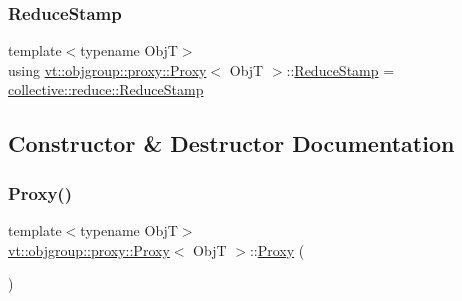\mbox{\label{structvt_1_1objgroup_1_1proxy_1_1_proxy_a337be4c20cf11ff6477c7a66208cc909}} 
\subsubsection{\texorpdfstring{Reduce\+Stamp}{ReduceStamp}}
{\footnotesize\ttfamily template$<$typename ObjT$>$ \\
using \hyperlink{structvt_1_1objgroup_1_1proxy_1_1_proxy}{vt\+::objgroup\+::proxy\+::\+Proxy}$<$ ObjT $>$\+::\hyperlink{structvt_1_1objgroup_1_1proxy_1_1_proxy_a337be4c20cf11ff6477c7a66208cc909}{Reduce\+Stamp} =  \hyperlink{namespacevt_1_1collective_1_1reduce_a7b7cb3021ac5654d92825d9fab0250b2}{collective\+::reduce\+::\+Reduce\+Stamp}}



\subsection{Constructor \& Destructor Documentation}
\mbox{\label{structvt_1_1objgroup_1_1proxy_1_1_proxy_a5450776d9cabb2556765c0d0227c9589}} 
\subsubsection{\texorpdfstring{Proxy()}{Proxy()}\hspace{0.1cm}{\footnotesize\ttfamily [1/4]}}
{\footnotesize\ttfamily template$<$typename ObjT$>$ \\
\hyperlink{structvt_1_1objgroup_1_1proxy_1_1_proxy}{vt\+::objgroup\+::proxy\+::\+Proxy}$<$ ObjT $>$\+::\hyperlink{structvt_1_1objgroup_1_1proxy_1_1_proxy}{Proxy} (\begin{DoxyParamCaption}{ }\end{DoxyParamCaption})\hspace{0.3cm}{\ttfamily [default]}}

\mbox{\label{structvt_1_1objgroup_1_1proxy_1_1_proxy_ad12a9b75a3c4844144d7a159b11af5ec}} 
